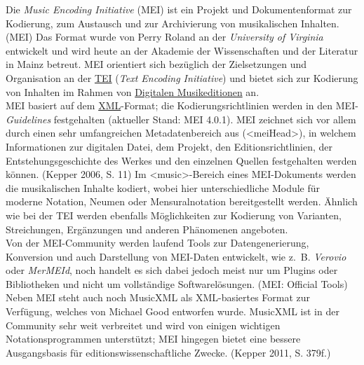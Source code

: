 \documentclass{article}
\begin{document}
    Die \emph{Music Encoding Initiative} (MEI) ist ein Projekt und
                  Dokumentenformat zur Kodierung, zum Austausch und zur Archivierung von
                  musikalischen Inhalten. (MEI) Das Format wurde von Perry Roland an
                  der \emph{University of Virginia} entwickelt und wird heute an der
                  Akademie der Wissenschaften und der Literatur in Mainz betreut. MEI orientiert
                  sich bezüglich der Zielsetzungen und Organisation an der \href{http://gams.uni-graz.at/o:konde.178}{TEI} (\emph{Text Encoding
                     Initiative}) und bietet sich zur Kodierung von Inhalten im Rahmen von \href{http://gams.uni-graz.at/o:konde.139}{Digitalen Musikeditionen} an.\\
            
        MEI basiert auf dem \href{http://gams.uni-graz.at/o:konde.225}{XML}-Format;
                  die Kodierungsrichtlinien werden in den MEI-\emph{Guidelines}
                  festgehalten (aktueller Stand: MEI 4.0.1). MEI zeichnet sich vor allem durch einen
                  sehr umfangreichen Metadatenbereich aus (<meiHead>), in welchem
                  Informationen zur digitalen Datei, dem Projekt, den Editionsrichtlinien, der
                  Entstehungsgeschichte des Werkes und den einzelnen Quellen festgehalten werden
                  können. (Kepper 2006, S. 11) Im <music>-Bereich
                  eines MEI-Dokuments werden die musikalischen Inhalte kodiert, wobei hier
                  unterschiedliche Module für moderne Notation, Neumen oder Mensuralnotation
                  bereitgestellt werden. Ähnlich wie bei der TEI werden ebenfalls Möglichkeiten zur
                  Kodierung von Varianten, Streichungen, Ergänzungen und anderen Phänomenen
                  angeboten.\\
            
        Von der MEI-Community werden laufend Tools zur Datengenerierung, Konversion und
                  auch Darstellung von MEI-Daten entwickelt, wie z. B. \emph{Verovio} oder \emph{MerMEId}, noch handelt es sich dabei
                  jedoch meist nur um Plugins oder Bibliotheken und nicht um vollständige
                  Softwarelösungen. (MEI: Official Tools)\\
            
        Neben MEI steht auch noch MusicXML als XML-basiertes Format zur Verfügung, welches
                  von Michael Good entworfen wurde. MusicXML ist in der Community sehr weit
                  verbreitet und wird von einigen wichtigen Notationsprogrammen unterstützt; MEI
                  hingegen bietet eine bessere Ausgangsbasis für editionswissenschaftliche Zwecke.
                     (Kepper 2011, S. 379f.)\\
            
\end{document}
